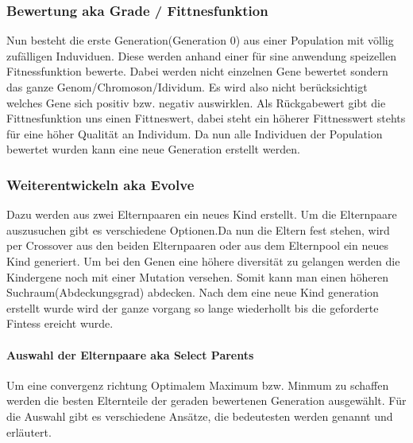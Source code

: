 \subsubsection{Bewertung aka Grade / Fittnesfunktion}
Nun besteht die erste Generation(Generation 0) aus einer Population mit völlig zufälligen Induviduen. Diese werden anhand einer für sine anwendung speizellen Fitnessfunktion bewerte. Dabei werden nicht einzelnen Gene bewertet sondern das ganze Genom/Chromoson/Idividum. Es wird also nicht berücksichtigt welches Gene sich positiv bzw. negativ auswirklen. Als Rückgabewert gibt die Fittnesfunktion uns einen Fittneswert, dabei steht ein höherer Fittnesswert stehts für eine höher Qualität an Individum. Da nun alle Individuen der Population bewertet wurden kann eine neue Generation erstellt werden.


\subsubsection{Weiterentwickeln aka Evolve}
Dazu werden aus zwei Elternpaaren ein neues Kind erstellt. Um die Elternpaare auszusuchen gibt es verschiedene Optionen.Da nun die Eltern fest stehen, wird per Crossover aus den beiden Elternpaaren oder aus dem Elternpool ein neues Kind generiert. Um bei den Genen eine höhere diversität zu gelangen werden die Kindergene noch mit einer Mutation versehen. Somit kann man einen höheren Suchraum(Abdeckungsgrad) abdecken. Nach dem eine neue Kind generation erstellt wurde wird der ganze vorgang so lange wiederhollt bis die geforderte Fintess ereicht wurde.

\paragraph{Auswahl der Elternpaare aka Select Parents}
Um eine convergenz richtung Optimalem Maximum bzw. Minmum zu schaffen werden die besten Elternteile der geraden bewertenen Generation ausgewählt.
Für die Auswahl gibt es verschiedene Ansätze, die bedeutesten werden genannt und erläutert.


